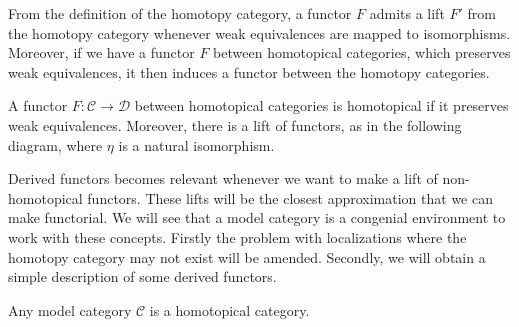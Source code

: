 \documentclass[../thesis.tex]{subfiles}
\begin{document}
            From the definition of the homotopy category, a functor $F$ admits a lift $F'$ from the homotopy category whenever weak equivalences are mapped to isomorphisms. Moreover, if we have a functor $F$ between homotopical categories, which preserves weak equivalences, it then induces a functor between the homotopy categories.
            
            \begin{definition}
                A functor $F:\mathcal{C}\rightarrow \mathcal{D}$ between homotopical categories is homotopical if it preserves weak equivalences. Moreover, there is a lift of functors, as in the following diagram, where $\eta$ is a natural isomorphism.

                \begin{center}
                \end{center}
            \end{definition}

            Derived functors becomes relevant whenever we want to make a lift of non-homotopical functors. These lifts will be the closest approximation that we can make functorial. 
            We will see that a model category is a congenial environment to work with these concepts. Firstly the problem with localizations where the homotopy category may not exist will be amended. Secondly, we will obtain a simple description of some derived functors.
            
            \begin{proposition}
                Any model category $\mathcal{C}$ is a homotopical category.
            \end{proposition}
\end{document}
